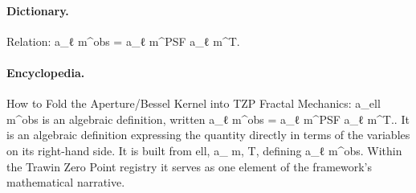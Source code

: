 \paragraph{Dictionary.}
Relation: a\_ℓ m\textasciicircum{}obs = a\_ℓ m\textasciicircum{}PSF a\_ℓ m\textasciicircum{}T.

\paragraph{Encyclopedia.}
How to Fold the Aperture/Bessel Kernel into TZP Fractal Mechanics: a\_ell m\textasciicircum{}obs is an algebraic definition, written a\_ℓ m\textasciicircum{}obs = a\_ℓ m\textasciicircum{}PSF a\_ℓ m\textasciicircum{}T.. It is an algebraic definition expressing the quantity directly in terms of the variables on its right-hand side. It is built from ell, a\_ m, T, defining a\_ℓ m\textasciicircum{}obs. Within the Trawin Zero Point registry it serves as one element of the framework's mathematical narrative.

